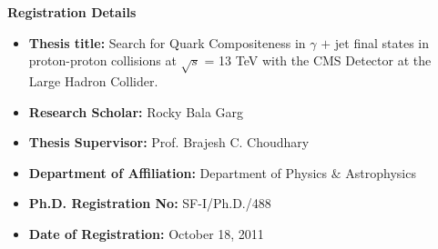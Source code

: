 \documentclass[12pt,a4]{article}
\begin{document}
\pagebreak
\begin{center}
  \textbf{\large{Registration Details}}
  \begin{itemize}
  \item \textbf{Thesis title:} Search for Quark Compositeness in $\gamma$ $+$ jet final states in proton-proton collisions at $\sqrt{s}$ = 13 TeV with the CMS
    Detector at the Large Hadron Collider.
  \item \textbf{Research Scholar:} Rocky Bala Garg
  \item \textbf{Thesis Supervisor:} Prof. Brajesh C. Choudhary
  \item \textbf{Department of Affiliation:} Department of Physics $\&$ Astrophysics
  \item \textbf{Ph.D. Registration No:} SF-I/Ph.D./488
   \item \textbf{Date of Registration:} October 18, 2011
  \end{itemize}
\end{center}
\end{document}
